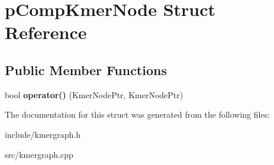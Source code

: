 \hypertarget{structpCompKmerNode}{}\section{p\+Comp\+Kmer\+Node Struct Reference}
\label{structpCompKmerNode}
\subsection*{Public Member Functions}
\begin{DoxyCompactItemize}
\item 
\mbox{\label{structpCompKmerNode_a31eb79aeb16c8dddc59a2dee12d74a3f}} 
bool {\bfseries operator()} (Kmer\+Node\+Ptr, Kmer\+Node\+Ptr)
\end{DoxyCompactItemize}


The documentation for this struct was generated from the following files\+:\begin{DoxyCompactItemize}
\item 
include/kmergraph.\+h\item 
src/kmergraph.\+cpp\end{DoxyCompactItemize}
